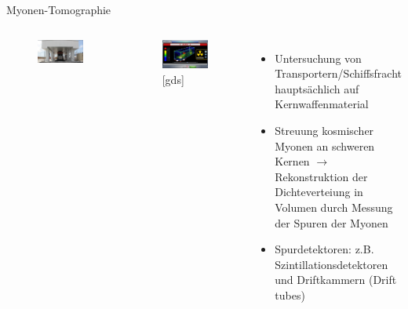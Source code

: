 \begin{frame}{Myonen-Tomographie}
\begin{columns}[T]
			\begin{figure}[htbp]
			  \centering
			  \includegraphics[width=0.8\columnwidth]{bilder/beispiele/muoncargo}
			\end{figure}
			\vspace{-0.3cm}
				\begin{figure}[htbp]
			  \centering
			  \includegraphics[width=.8\columnwidth]{bilder/beispiele/muondetected}
			  \caption*{[gds]}
			\end{figure}
		\hspace{1cm}
		
		\begin{itemize}
		  \item Untersuchung von Transportern/Schiffsfracht hauptsächlich auf Kernwaffenmaterial
		  \item Streuung kosmischer Myonen an schweren Kernen $\rightarrow$ Rekonstruktion der
		  Dichteverteiung in Volumen durch Messung der Spuren der Myonen
		  \item Spurdetektoren: z.B. Szintillationsdetektoren und Driftkammern (Drift tubes)
		\end{itemize}
    \end{columns}
\end{frame}